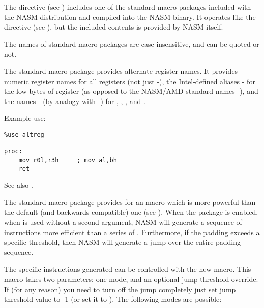 %
%

The  directive (see ) includes one of
the standard macro packages included with the NASM distribution and compiled
into the NASM binary. It operates like the  directive (see
), but the included contents is provided by NASM itself.

The names of standard macro packages are case insensitive, and can be
quoted or not.


The  standard macro package provides alternate register
names. It provides numeric register names for all registers (not just
-), the Intel-defined aliases -
for the low bytes of register (as opposed to the NASM/AMD standard names
-), and the names - (by analogy
with -) for , , ,
and .

Example use:

\begin{lstlisting}
%use altreg

proc:
    mov r0l,r3h     ; mov al,bh
    ret
\end{lstlisting}

See also .


The  standard macro package provides for an
 macro which is more powerful than the default (and
backwards-compatible) one (see ). When the
 package is enabled, when  is used without
a second argument, NASM will generate a sequence of instructions more
efficient than a series of . Furthermore, if the padding
exceeds a specific threshold, then NASM will generate a jump over
the entire padding sequence.

The specific instructions generated can be controlled with the
new  macro. This macro takes two parameters: one mode,
and an optional jump threshold override. If (for any reason) you need
to turn off the jump completely just set jump threshold value to -1
(or set it to ). The following modes are possible:

